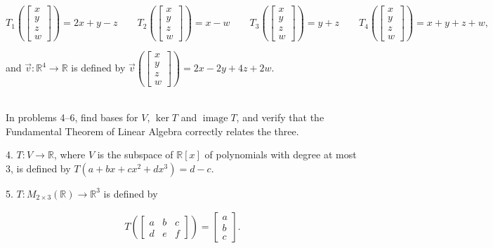 \documentclass{article}
\begin{document}
$$
	T_1\left(\left[\begin{array}{c} x \\ y \\ z \\ w \end{array}\right]\right) = 2x + y - z \qquad T_2\left(\left[\begin{array}{c} x \\ y \\ z \\ w \end{array}\right]\right) = x - w \qquad T_3\left(\left[\begin{array}{c} x \\ y \\ z \\ w \end{array}\right]\right) = y + z \qquad T_4\left(\left[\begin{array}{c} x \\ y \\ z \\ w \end{array}\right]\right) = x + y + z + w,
$$

and $\vec{v} : \mathbb{R}^4 \to \mathbb{R}$ is defined by $\vec{v}\left(\left[\begin{array}{c} x \\ y \\ z \\ w \end{array}\right]\right) = 2x - 2y + 4z + 2w$.

~\\

In problems 4--6, find bases for $V$, $\ker T$ and $\operatorname{image} T$, and verify that the Fundamental Theorem of Linear Algebra correctly relates the three.

4. $T : V \to \mathbb{R}$, where $V$ is the subspace of $\mathbb{R}[x]$ of polynomials with degree at most $3$, is defined by $T(a + bx + cx^2 + dx^3) = d - c$.

5. $T : M_{2 \times 3}(\mathbb{R}) \to \mathbb{R}^3$ is defined by

\begin{align*}
	T\left( \left[\begin{array}{ccc} a& b& c \\ d& e& f \end{array}\right] \right) = \left[\begin{array}{c} a \\ b \\ c \end{array}\right].
\end{align*}
\end{document}
